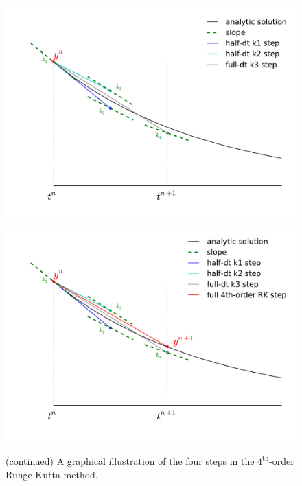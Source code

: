 \begin{figure}[t]
\ContinuedFloat
\centering
\includegraphics[width=0.65\linewidth]{rk4_k4} \\
\includegraphics[width=0.7\linewidth]{rk4_final} \\
%
\caption[$4^\mathrm{th}$-order Runge-Kutta continued] {(continued) A graphical illustration of the four steps in the
  $4^\mathrm{th}$-order Runge-Kutta method.}
\end{figure}



